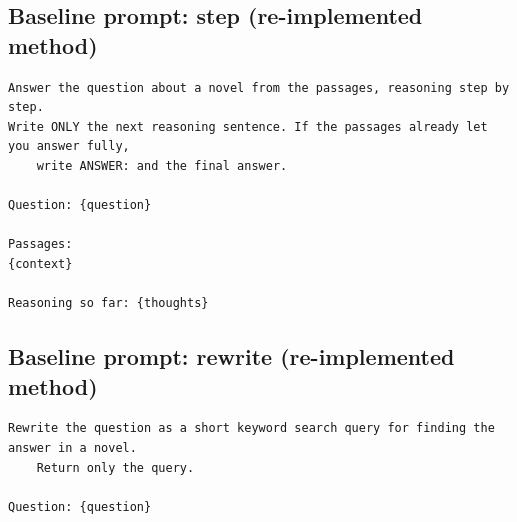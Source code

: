 \subsection{Baseline prompt: step (re-implemented method)}
\begin{footnotesize}
\begin{verbatim}
Answer the question about a novel from the passages, reasoning step by step.
Write ONLY the next reasoning sentence. If the passages already let you answer fully,
    write ANSWER: and the final answer.

Question: {question}

Passages:
{context}

Reasoning so far: {thoughts}
\end{verbatim}
\end{footnotesize}

\subsection{Baseline prompt: rewrite (re-implemented method)}
\begin{footnotesize}
\begin{verbatim}
Rewrite the question as a short keyword search query for finding the answer in a novel.
    Return only the query.

Question: {question}
\end{verbatim}
\end{footnotesize}
